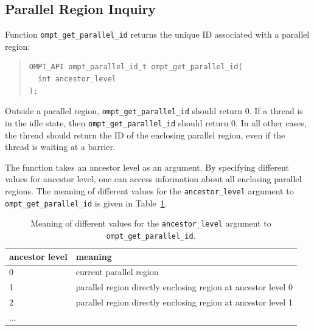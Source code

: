 \documentclass{article}
\begin{document}

\subsection{Parallel Region Inquiry} 
\label{sec:parallel-inquiry} 
Function \verb|ompt_get_parallel_id| returns  
 the unique ID associated with a parallel region:
 
 
\begin{quote}
\begin{verbatim}
OMPT_API ompt_parallel_id_t ompt_get_parallel_id(
  int ancestor_level
);
\end{verbatim}
\end{quote}

\noindent 
Outside a parallel region, \verb|ompt_get_parallel_id| should return 0. If a thread is in the idle state, then \verb|ompt_get_parallel_id| should return 0.  
In all other cases, 
the thread should return the ID of the enclosing parallel region, even if the thread is waiting at a barrier.

The function takes an ancestor level as an argument. By specifying different values for
ancestor level, one can access information about all enclosing parallel regions. The meaning of different values for the \verb|ancestor_level| argument to \verb|ompt_get_parallel_id| is given in Table~\ref{tab:ancestor}.

\begin{table}
\centering
\begin{tabular}{|l|l|}
\hline
ancestor level  & meaning\\\hline
 0 & current parallel region  \\\hline
1 &parallel region directly enclosing region at ancestor level 0 \\\hline
2 & parallel region directly enclosing region at ancestor level 1 \\\hline
... & \\\hline
\end{tabular}
\caption{Meaning of different  values for the {\tt ancestor\_level} argument to {\tt ompt\_get\_parallel\_id}.}
\label{tab:ancestor}
\end{table}
 
\end{document}
